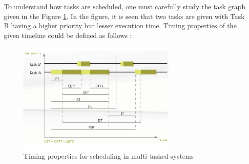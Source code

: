 To understand how tasks are scheduled, one must carefully study the task graph given in the Figure \ref{fig:scheduling}. In the figure, it is seen that two tasks are given with Task B having a higher priority but lesser execution time. Timing properties of the given timeline could be defined as follows \cite{timingposter} \cite{lukas1}:
\begin{figure}[!ht]
	\centering
	\includegraphics[width=0.7\textwidth]{content/images/scheduling.pdf}
	\caption{Timing properties for scheduling in multi-tasked systems \cite{timingposter}}
	\label{fig:scheduling}
\end{figure}
